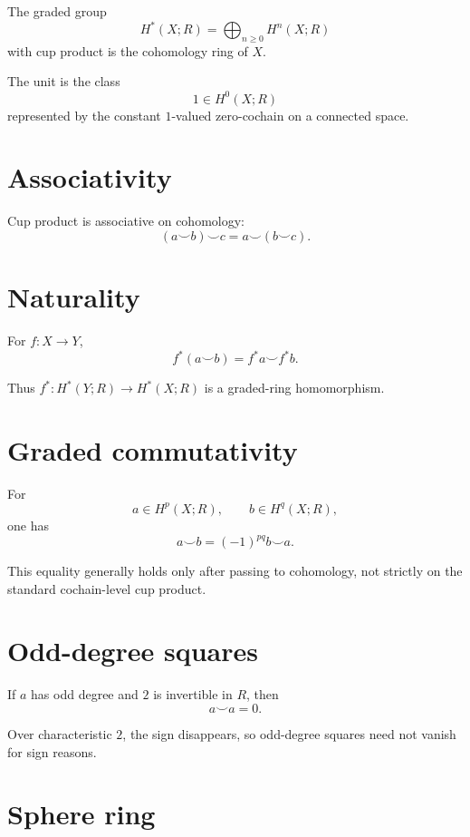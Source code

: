 \begin{definition}
\label{def:viii29-ring}
The graded group
\[
H^*(X;R)=\bigoplus_{n\ge0}H^n(X;R)
\]
with cup product is the cohomology ring of \(X\).
\end{definition}

The unit is the class
\[
1\in H^0(X;R)
\]
represented by the constant \(1\)-valued zero-cochain on a connected space.

\section{Associativity}
Cup product is associative on cohomology:
\[
(a\smile b)\smile c=a\smile(b\smile c).
\]

\section{Naturality}

\begin{theorem}[Naturality]
\label{thm:viii29-naturality}
For \(f:X\to Y\),
\[
f^*(a\smile b)=f^*a\smile f^*b.
\]
\end{theorem}

Thus \(f^*:H^*(Y;R)\to H^*(X;R)\) is a graded-ring homomorphism.

\section{Graded commutativity}

\begin{theorem}
\label{thm:viii29-graded-comm}
For
\[
a\in H^p(X;R),
\qquad
b\in H^q(X;R),
\]
one has
\[
a\smile b=(-1)^{pq}b\smile a.
\]
\end{theorem}

This equality generally holds only after passing to cohomology, not strictly on
the standard cochain-level cup product.

\section{Odd-degree squares}

If \(a\) has odd degree and \(2\) is invertible in \(R\), then
\[
a\smile a=0.
\]

Over characteristic \(2\), the sign disappears, so odd-degree squares need not
vanish for sign reasons.

\section{Sphere ring}

